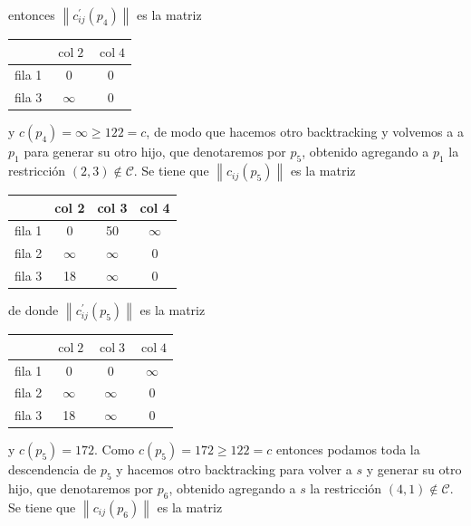 \documentclass[10pt]{article}
\begin{document}
entonces $\left\|c_{i j}^{\prime}\left(p_{4}\right)\right\|$ es la matriz

\begin{center}
\begin{tabular}{|l|c|c|}
\hline
 & $\operatorname{col} 2$ & $\operatorname{col} 4$ \\
\hline
fila 1 & 0 & 0 \\
\hline
fila 3 & $\infty$ & 0 \\
\hline
\end{tabular}
\end{center}

y $c\left(p_{4}\right)=\infty \geq 122=c$, de modo que hacemos otro backtracking y volvemos a a $p_{1}$ para generar su otro hijo, que denotaremos por $p_{5}$, obtenido agregando a $p_{1}$ la restricción $(2,3) \notin \mathcal{C}$. Se tiene que $\left\|c_{i j}\left(p_{5}\right)\right\|$ es la matriz

\begin{center}
\begin{tabular}{|l|c|c|c|}
\hline
 & col 2 & col 3 & col 4 \\
\hline
fila 1 & 0 & 50 & $\infty$ \\
\hline
fila 2 & $\infty$ & $\infty$ & 0 \\
\hline
fila 3 & 18 & $\infty$ & 0 \\
\hline
\end{tabular}
\end{center}

de donde $\left\|c_{i j}^{\prime}\left(p_{5}\right)\right\|$ es la matriz

\begin{center}
\begin{tabular}{|l|c|c|c|}
\hline
 & $\operatorname{col} 2$ & $\operatorname{col} 3$ & $\operatorname{col} 4$ \\
\hline
fila 1 & 0 & 0 & $\infty$ \\
\hline
fila 2 & $\infty$ & $\infty$ & 0 \\
\hline
fila 3 & 18 & $\infty$ & 0 \\
\hline
\end{tabular}
\end{center}

y $c\left(p_{5}\right)=172$. Como $c\left(p_{5}\right)=172 \geq 122=c$ entonces podamos toda la descendencia de $p_{5}$ y hacemos otro backtracking para volver a $s$ y generar su otro hijo, que denotaremos por $p_{6}$, obtenido agregando a $s$ la restricción $(4,1) \notin \mathcal{C}$. Se tiene que $\left\|c_{i j}\left(p_{6}\right)\right\|$ es la matriz
\end{document}
